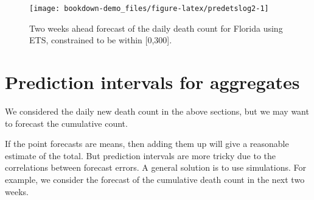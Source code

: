 \documentclass[]{book}
\newenvironment{Shaded}{\begin{snugshade}}{\end{snugshade}}
\newcommand{\KeywordTok}[1]{\textcolor[rgb]{0.13,0.29,0.53}{\textbf{#1}}}
\newcommand{\DataTypeTok}[1]{\textcolor[rgb]{0.13,0.29,0.53}{#1}}
\newcommand{\DecValTok}[1]{\textcolor[rgb]{0.00,0.00,0.81}{#1}}
\newcommand{\StringTok}[1]{\textcolor[rgb]{0.31,0.60,0.02}{#1}}
\newcommand{\CommentTok}[1]{\textcolor[rgb]{0.56,0.35,0.01}{\textit{#1}}}
\newcommand{\OperatorTok}[1]{\textcolor[rgb]{0.81,0.36,0.00}{\textbf{#1}}}
\newcommand{\NormalTok}[1]{#1}
\begin{document}
\begin{figure}

{\centering \texttt{[image: bookdown-demo\_files/figure-latex/predetslog2-1]} 

}

\caption{Two weeks ahead forecast of the daily death count for Florida using ETS, constrained to be within [0,300].}\label{fig:predetslog2}
\end{figure}

\section{Prediction intervals for
aggregates}\label{prediction-intervals-for-aggregates}

We considered the daily new death count in the above sections, but we
may want to forecast the cumulative count.

If the point forecasts are means, then adding them up will give a
reasonable estimate of the total. But prediction intervals are more
tricky due to the correlations between forecast errors. A general
solution is to use simulations. For example, we consider the forecast of
the cumulative death count in the next two weeks.

\begin{Shaded}
\end{Shaded}
\end{document}
